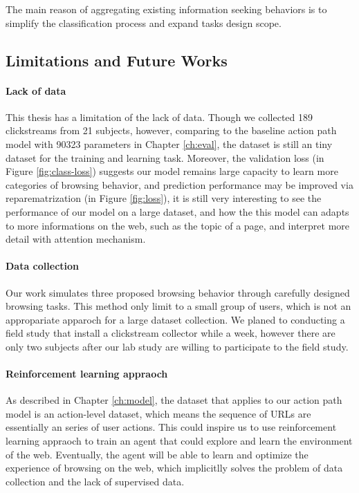 The main reason of aggregating existing information seeking behaviors is to simplify the 
classification process and expand tasks design scope.


\subsection{Limitations and Future Works}

\paragraph{Lack of data} 
This thesis has a limitation of the lack of data. 
Though we collected 189 clickstreams from 21 subjects, however, 
comparing to the baseline action path model with 90323 parameters in Chapter \ref{ch:eval},
the dataset is still an tiny dataset for the training and learning task.
Moreover, the validation loss (in Figure \ref{fig:class-loss}) suggests our model remains large capacity to learn more
categories of browsing behavior, and prediction performance may be improved
via reparematrization (in Figure \ref{fig:loss}), 
it is still very interesting to see the performance of our model on a large dataset,
and how the this model can adapts to more informations on the web, such as the topic of 
a page, and interpret more detail with attention mechanism.

\paragraph{Data collection}
Our work simulates three proposed browsing behavior through carefully designed browsing tasks.
This method only limit to a small group of users, which is not an appropariate apparoch for
a large dataset collection.
We planed to conducting a field study that install a clickstream collector while a week, 
however there are only two subjects after our lab study
are willing to participate to the field study.

\paragraph{Reinforcement learning appraoch}
As described in Chapter \ref{ch:model}, the dataset that applies to our action path model
is an action-level dataset, which means the sequence of URLs are essentially an series of 
user actions. This could inspire us to use reinforcement learning appraoch to train
an agent that could explore and learn the environment of the web. Eventually,
the agent will be able to learn and optimize the experience of browsing on the web,
which implicitlly solves the problem of data collection and the lack of supervised data.

